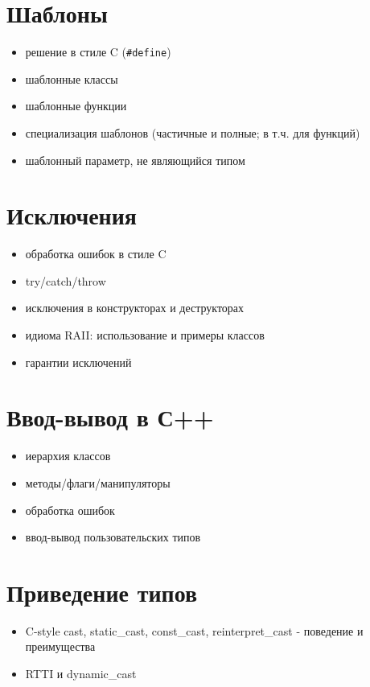 \documentclass[11pt,dvipsnames]{report}
\begin{document}
\section{Шаблоны}
\begin{itemize}[noitemsep]
    \item решение в стиле C (\texttt{\#define})
    \item шаблонные классы
    \item шаблонные функции
    \item специализация шаблонов (частичные и полные; в т.ч. для функций)
    \item шаблонный параметр, не являющийся типом
\end{itemize}

\section{Исключения}
\begin{itemize}[noitemsep]
    \item обработка ошибок в стиле C
    \item try/catch/throw
    \item исключения в конструкторах и деструкторах
    \item идиома RAII: использование и примеры классов
    \item гарантии исключений
\end{itemize}

\section{Ввод-вывод в С++}
\begin{itemize}[noitemsep]
    \item иерархия классов
    \item методы/флаги/манипуляторы
    \item обработка ошибок
    \item ввод-вывод пользовательских типов
\end{itemize}

\section{Приведение типов}
\begin{itemize}[noitemsep]
    \item C-style cast, static\_cast, const\_cast, reinterpret\_cast - поведение и преимущества
    \item RTTI и dynamic\_cast
\end{itemize}
\end{document}
